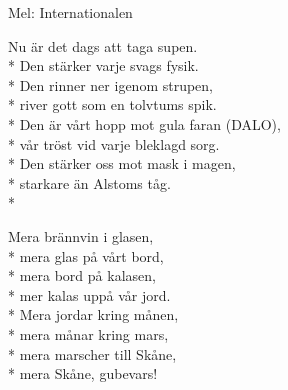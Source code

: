\begin{SongText}
    \begin{SongInfo}
        Mel: Internationalen
    \end{SongInfo}
    \begin{SongVerse}
        Nu är det dags att taga supen.\\*%
        Den stärker varje svags fysik.\\*%
        Den rinner ner igenom strupen,\\*%
        river gott som en tolvtums spik.\\*%
        Den är vårt hopp mot gula faran (DALO),\\*%
        vår tröst vid varje bleklagd sorg.\\*%
        Den stärker oss mot mask i magen,\\*%
        starkare än Alstoms tåg.\\*%
    \end{SongVerse}
    \begin{SongVerse}
        Mera brännvin i glasen,\\*%
        mera glas på vårt bord,\\*%
        mera bord på kalasen,\\*%
        mer kalas uppå vår jord.\\*%
        Mera jordar kring månen,\\*%
        mera månar kring mars,\\*%
        mera marscher till Skåne,\\*%
        mera Skåne, gubevars!
    \end{SongVerse}
\end{SongText}